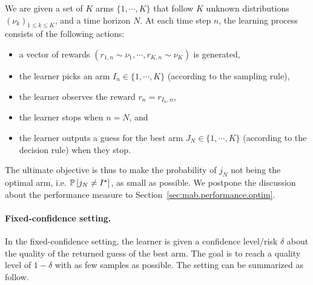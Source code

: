 \begin{definition}\label{def:mab.bai_budget}
\begin{leftbar}[defnbar]
	We are given a set of $K$ arms $\{1,\cdots,K\}$ that follow $K$ unknown distributions $(\nu_k)_{1 \leq k \leq K}$, and a time horizon $N$. At each time step $n$, the learning process consists of the following actions:
\begin{itemize}
	\item a vector of rewards $(r_{1,n} \sim \nu_1, \cdots, r_{K,n} \sim \nu_K)$ is generated,
	\item the learner picks an arm $I_n \in \{1,\cdots,K\}$ (according to the sampling rule),
	\item the learner observes the reward $r_n = r_{I_n, n}$,
	\item the learner stops when $n=N$, and
	\item the learner outputs a guess for the best arm $J_N \in \{1,\cdots,K\}$ (according to the decision rule) when they stop.
\end{itemize}
\end{leftbar}
\end{definition}

The ultimate objective is thus to make the probability of $j_N$ not being the optimal arm, i.e. $\mathbb{P}\left[j_N\neq I^\star\right]$, as small as possible. We postpone the discussion about the performance measure to Section~\ref{sec:mab.performance.optim}.

\paragraph{Fixed-confidence setting.}

In the fixed-confidence setting, the learner is given a confidence level/risk $\delta$ about the quality of the returned guess of the best arm. The goal is to reach a quality level of $1-\delta$ with as few samples as possible. The setting can be summarized as follow.

